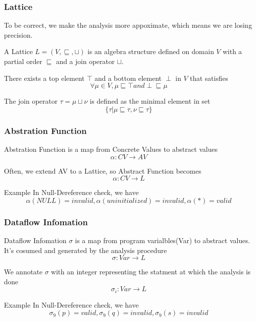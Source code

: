 \documentclass[]{beamer}
\begin{document}
\begin{frame}
  \frametitle{Lattice}
  To be correct, we make the analysis more appoximate, which means we are losing precision.

  \vspace{1em}\pause
  A \alert{Lattice} $L=(V, \sqsubseteq, \sqcup)$ is an algebra structure defined on domain $V$ with a
  \alert{partial order} $\sqsubseteq$ and a \alert{join operator} $\sqcup$.

  \vspace{1em}\pause
  There exists a \alert{top} element $\top$ and a \alert{bottom} element $\perp$ in $V$ that satisfies
  $$\forall \mu \in V, \mu \sqsubseteq \top and \perp \sqsubseteq \mu$$

  \vspace{1em}\pause
  The join operator $\tau = \mu \sqcup \nu$ is defined as the minimal element in set
  $$\{\tau | \mu \sqsubseteq \tau, \nu \sqsubseteq \tau\}$$
\end{frame}

\begin{frame}
  \frametitle{Abstration Function}
  \alert{Abstration Function} is a map from Concrete Values to abstract values
  $$\alpha : CV \rightarrow AV$$

  \vspace{1em}\pause
  Often, we extend AV to a Lattice, so Abstract Function becomes
  $$\alpha : CV \rightarrow L$$

  \pause
  \begin{block}{Example}
    In Null-Dereference check, we have
    $$\alpha(NULL) = invalid, \alpha(uninitialized) = invalid,
    \alpha(*)=valid$$
  \end{block}
\end{frame}

\begin{frame}
  \frametitle{Dataflow Infomation}
  \alert{Dataflow Infomation} $\sigma$ is a map from program varialbles(Var) to abstract values.
  It's cosumed and generated by the analysis procedure
  $$\sigma : Var \rightarrow L$$

  \vspace{1em}\pause
  We annotate $\sigma$ with an integer representing the statment at which the analysis is done
  $$\sigma_i : Var \rightarrow L$$

  \pause
  \begin{block}{Example}
    In Null-Dereference check, we have
    $$\sigma_9(p) = valid, \sigma_9(q) = invalid,
    \sigma_9(s)=invalid$$
  \end{block}
\end{frame}
\end{document}
